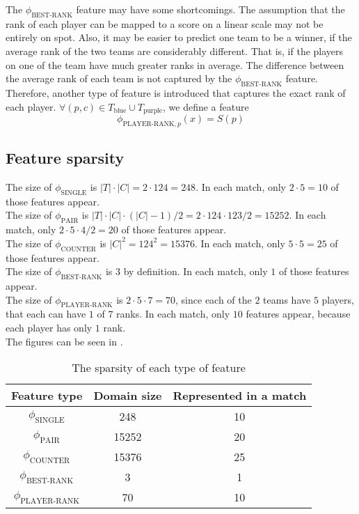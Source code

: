 The $\phi_\text{BEST-RANK}$ feature may have some shortcomings. The assumption that the rank of each player can be mapped to a score on a linear scale may not be entirely on spot.
Also, it may be easier to predict one team to be a winner, if the average rank of the two teams are considerably different. That is, if the players on one of the team have much greater ranks in average. The difference between the average rank of each team is not captured by the $\phi_\text{BEST-RANK}$ feature.
Therefore, another type of feature is introduced that captures the exact rank of each player.
$\forall(p, c) \in T_\text{blue} \cup T_\text{purple}$, we define a feature
\[
\phi_{\text{PLAYER-RANK},p}(x) = S(p)
\]


\subsection{Feature sparsity}\label{sec:featuresparsity}
The size of $\phi_{\text{SINGLE}}$ is $|T| \cdot |C| = 2 \cdot 124 = 248$. In each match, only $2 \cdot 5 = 10$ of those features appear.\\
The size of $\phi_{\text{PAIR}}$ is $|T| \cdot |C| \cdot (|C|-1) / 2 = 2 \cdot 124 \cdot 123 / 2 = 15252$. In each match, only $2 \cdot 5 \cdot 4 / 2 = 20$ of those features appear.\\
The size of $\phi_{\text{COUNTER}}$ is $|C|^2 = 124^2 = 15376$. In each match, only $5 \cdot 5 = 25$ of those features appear.\\
The size of $\phi_{\text{BEST-RANK}}$ is 3 by definition. In each match, only $1$ of those features appear.\\
The size of $\phi_{\text{PLAYER-RANK}}$ is $2 \cdot 5 \cdot 7 = 70$, since each of the $2$ teams have $5$ players, that each can have $1$ of $7$ ranks. In each match, only $10$ features appear, because each player has only $1$ rank.\\
The figures can be seen in .

\begin{center}
\begin{table}[h]
\begin{tabular}{|c|c|c|}
\hline
Feature type                & Domain size & Represented in a match \\ \hline
$\phi_{\text{SINGLE}}$      & 248         & 10                     \\ \hline
$\phi_{\text{PAIR}}$        & 15252       & 20                     \\ \hline
$\phi_{\text{COUNTER}}$     & 15376       & 25                     \\ \hline
$\phi_{\text{BEST-RANK}}$   & 3           & 1                      \\ \hline
$\phi_{\text{PLAYER-RANK}}$ & 70          & 10                     \\ \hline
\end{tabular}
\caption{The sparsity of each type of feature}\label{tab:featuresparsity}
\end{table}
\end{center}

